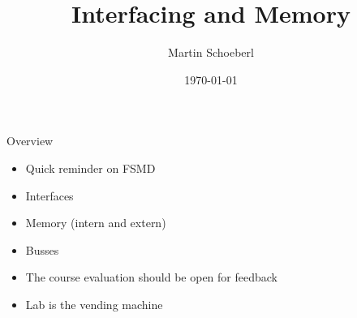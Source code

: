

\newif\ifbook


\title{Interfacing and Memory}
\author{Martin Schoeberl}
\date{\today}



\begin{frame}
\titlepage
\end{frame}


\begin{frame}[fragile]{Overview}
\begin{itemize}
\item Quick reminder on FSMD
\item Interfaces
\item Memory (intern and extern)
\item Busses
\item The course evaluation should be open for feedback
\item Lab is the vending machine
\end{itemize}
\end{frame}

